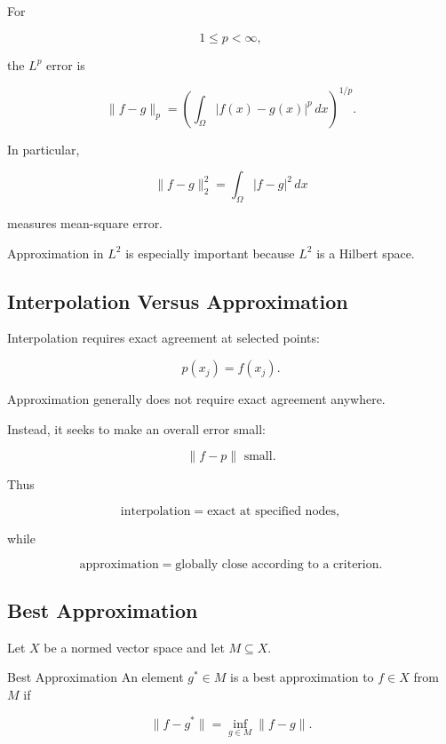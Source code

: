 For

\[
1\leq p<\infty,
\]

the \(L^p\) error is

\[
\boxed{
\|f-g\|_p
=
\left(
\int_\Omega
|f(x)-g(x)|^p\,dx
\right)^{1/p}.
}
\]

In particular,

\[
\boxed{
\|f-g\|_2^2
=
\int_\Omega
|f-g|^2\,dx
}
\]

measures mean-square error.

Approximation in \(L^2\) is especially important because \(L^2\) is a
Hilbert space.

\subsection{Interpolation Versus Approximation}
\label{subsec:interpolation-versus-approximation}

Interpolation requires exact agreement at selected points:

\[
\boxed{
p(x_j)=f(x_j).
}
\]

Approximation generally does not require exact agreement anywhere.

Instead, it seeks to make an overall error small:

\[
\boxed{
\|f-p\|
\text{ small}.
}
\]

Thus

\[
\boxed{
\text{interpolation}
=
\text{exact at specified nodes},
}
\]

while

\[
\boxed{
\text{approximation}
=
\text{globally close according to a criterion}.
}
\]

\subsection{Best Approximation}
\label{subsec:best-approximation}

Let \(X\) be a normed vector space and let \(M\subseteq X\).

\begin{definitionbox}{Best Approximation}
An element \(g^\ast\in M\) is a best approximation to \(f\in X\) from
\(M\) if

\[
\boxed{
\|f-g^\ast\|
=
\inf_{g\in M}\|f-g\|.
}
\]
\end{definitionbox}

